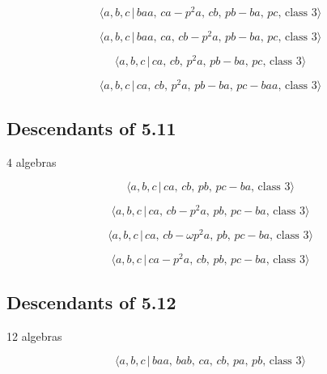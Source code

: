 \documentclass[10pt]{article}
\begin{document}
\begin{equation}
\langle a,b,c\,|\,baa,\,ca-p^2a,\,cb,\,pb-ba,\,pc,\,\text{class }3\rangle 
\tag{6.208}
\end{equation}

\begin{equation}
\langle a,b,c\,|\,baa,\,ca,\,cb-p^2a,\,pb-ba,\,pc,\,\text{class }3\rangle 
\tag{6.209}
\end{equation}

\begin{equation}
\langle a,b,c\,|\,ca,\,cb,\,p^2a,\,pb-ba,\,pc,\,\text{class }3\rangle 
\tag{6.210}
\end{equation}

\begin{equation}
\langle a,b,c\,|\,ca,\,cb,\,p^2a,\,pb-ba,\,pc-baa,\,\text{class }3\rangle 
\tag{6.211}
\end{equation}

\subsection{Descendants of 5.11}

4 algebras

\begin{equation}
\langle a,b,c\,|\,ca,\,cb,\,pb,\,pc-ba,\,\text{class }3\rangle  \tag{6.212}
\end{equation}

\begin{equation}
\langle a,b,c\,|\,ca,\,cb-p^2a,\,pb,\,pc-ba,\,\text{class }3\rangle 
\tag{6.213}
\end{equation}

\begin{equation}
\langle a,b,c\,|\,ca,\,cb-\omega p^2a,\,pb,\,pc-ba,\,\text{class }3\rangle 
\tag{6.214}
\end{equation}

\begin{equation}
\langle a,b,c\,|\,ca-p^2a,\,cb,\,pb,\,pc-ba,\,\text{class }3\rangle 
\tag{6.215}
\end{equation}

\subsection{Descendants of 5.12}

12 algebras

\begin{equation}
\langle a,b,c\,|\,baa,\,bab,\,ca,\,cb,\,pa,\,pb,\,\text{class }3\rangle 
\tag{6.216}
\end{equation}
\end{document}
